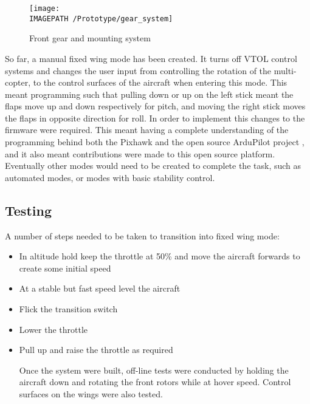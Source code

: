 \begin{figure}[!ht]
	\centering
	\texttt{[image: \\IMAGEPATH /Prototype/gear\_system]}
	\caption{Front gear and mounting system}
	\label{fig:gearsys}
\end{figure}

So far, a manual fixed wing mode has been created. It turns off VTOL control systems and changes the user input from controlling the rotation of the multi-copter, to the control surfaces of the aircraft when entering this mode. This meant programming such that pulling down or up on the left stick meant the flaps move up and down respectively for pitch, and moving the right stick moves the flaps in opposite direction for roll.  In order to implement this changes to the firmware were required.  This meant having  a complete understanding of the programming behind both the Pixhawk  and the open source ArduPilot project , and it also meant contributions were made to this open source platform. Eventually other modes would need to be created to complete the task, such as automated modes, or modes with basic stability control.\\

\subsection{Testing}
A number of steps needed to be taken to transition into fixed wing mode: 

\begin{itemize}
\item In altitude hold keep the throttle at 50\% and move the aircraft forwards to create some initial speed
\item At a stable but fast speed level the aircraft
\item Flick the transition switch 
\item Lower the throttle
\item Pull up and raise the throttle as required

Once the system were built, off-line tests were conducted by holding the aircraft down and rotating the front rotors while at hover speed. Control surfaces on the wings were also tested. 

		
\end{itemize}
